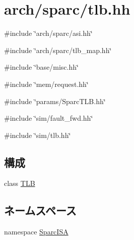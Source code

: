 \hypertarget{arch_2sparc_2tlb_8hh}{
\section{arch/sparc/tlb.hh}
\label{arch_2sparc_2tlb_8hh}
}
{\ttfamily \#include \char`\"{}arch/sparc/asi.hh\char`\"{}}\par
{\ttfamily \#include \char`\"{}arch/sparc/tlb\_\-map.hh\char`\"{}}\par
{\ttfamily \#include \char`\"{}base/misc.hh\char`\"{}}\par
{\ttfamily \#include \char`\"{}mem/request.hh\char`\"{}}\par
{\ttfamily \#include \char`\"{}params/SparcTLB.hh\char`\"{}}\par
{\ttfamily \#include \char`\"{}sim/fault\_\-fwd.hh\char`\"{}}\par
{\ttfamily \#include \char`\"{}sim/tlb.hh\char`\"{}}\par
\subsection*{構成}
\begin{DoxyCompactItemize}
\item 
class \hyperlink{classSparcISA_1_1TLB}{TLB}
\end{DoxyCompactItemize}
\subsection*{ネームスペース}
\begin{DoxyCompactItemize}
\item 
namespace \hyperlink{namespaceSparcISA}{SparcISA}
\end{DoxyCompactItemize}
